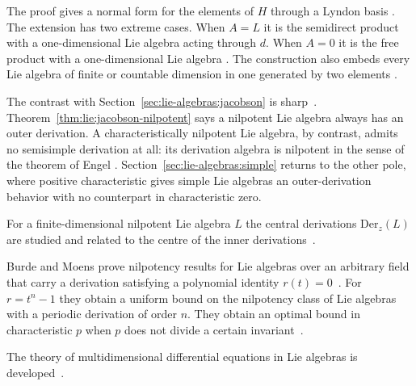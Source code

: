The proof gives a normal form for the elements of $H$ through a Lyndon basis
\cite[Theorem~5.1, p.~85]{Wasserman1998}. The extension has two extreme cases.
When $A=L$ it is the semidirect product with a one-dimensional Lie algebra
acting through $d$. When $A=0$ it is the free product with a one-dimensional
Lie algebra \cite[p.~83]{Wasserman1998}. The construction also embeds every
Lie algebra of finite or countable dimension in one generated by two elements
\cite[Theorem~7.2, p.~88]{Wasserman1998}.

The contrast with Section~\ref{sec:lie-algebras:jacobson} is sharp~\cite[p.~1]{Togo1969}.
Theorem~\ref{thm:lie:jacobson-nilpotent} says a nilpotent Lie algebra
always has an outer derivation.
A characteristically nilpotent Lie
algebra, by contrast, admits no semisimple derivation at all: its derivation
algebra is nilpotent in the sense of the theorem of Engel
\cite[p.~1]{Togo1969}.
Section~\ref{sec:lie-algebras:simple} returns
to the other pole, where positive characteristic gives simple Lie algebras
an outer-derivation behavior with no counterpart in characteristic zero.

For a finite-dimensional nilpotent Lie algebra $L$ the central derivations
$\mathrm{Der}_z(L)$ are studied and related to the centre of the inner
derivations~\cite{WlFiniteDimensionalNilpotentLieA2018}.

Burde and Moens prove nilpotency results for Lie algebras over an arbitrary
field that carry a derivation satisfying a polynomial identity $r(t)=0$~\cite{WlTheStructureOfLieAlgebrasWithA2022}. For
$r=t^n-1$ they obtain a uniform bound on the nilpotency class of Lie algebras
with a periodic derivation of order $n$. They obtain an optimal bound in
characteristic $p$ when $p$ does not divide a certain
invariant~\cite{WlTheStructureOfLieAlgebrasWithA2022}.

The theory of multidimensional differential equations in Lie algebras is
developed~\cite{WlTheTheoryOfMultidimensionalDif2020}.
